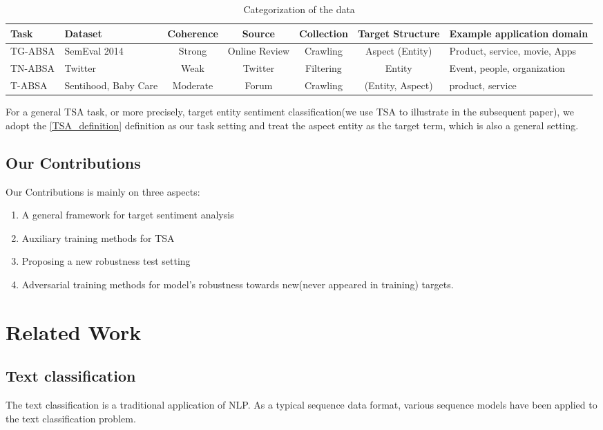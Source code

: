 \documentclass[fyp]{socreport}
\begin{document}
\begin{table}
    \centering
    \caption{Categorization of the data}
    \label{tab:autometrics}
    {\small
    \begin{tabular}{@{}l|p{0.72in}|c|c|c|c|p{0.8in}}
    \toprule
    Task & Dataset & Coherence  & Source & Collection & Target Structure & Example application domain\\
    \hline
    TG-ABSA & SemEval 2014 & Strong & Online Review & Crawling & Aspect (Entity) & Product, service, movie, Apps   \\
    TN-ABSA & Twitter & Weak & Twitter & Filtering & Entity & Event, people, organization   \\
    T-ABSA & Sentihood, Baby Care & Moderate & Forum& Crawling & (Entity, Aspect) & product, service   \\
    \bottomrule
    \end{tabular}
    }
    \end{table}

For a general TSA task, or more precisely, target entity sentiment classification(we use TSA to illustrate in the subsequent paper), we adopt the \ref{TSA_definition} definition as our task setting and treat the aspect entity as the target term, which is also a general setting.

\section{Our Contributions}
Our Contributions is mainly on three aspects:
\begin{enumerate}
    \item A general framework for target sentiment analysis
    \item Auxiliary training methods for TSA
    \item Proposing a new robustness test setting
    \item Adversarial training methods for model's robustness towards new(never appeared in training) targets.
\end{enumerate}


\chapter{Related Work}
\label{ch:related}
\section{Text classification}
The text classification is a traditional application of NLP. As a typical sequence data format, various sequence models have been applied to the text classification problem. 
\end{document}
